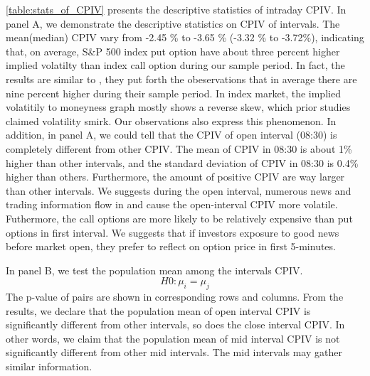 \autoref{table:stats_of_CPIV} presents the descriptive statistics of intraday CPIV. In panel A, we demonstrate the descriptive statistics on CPIV of intervals. The mean(median) CPIV vary from -2.45 \% to -3.65 \% (-3.32 \% to -3.72\%), indicating that, on average, S\&P 500 index put option have about three percent higher implied volatilty than index call option during our sample period. In fact, the results are similar to \textcite{atilgan2015implied}, they put forth the obeservations that in average there are nine percent higher during their sample period. In index market, the implied volatitily to moneyness graph mostly shows a reverse skew, which prior studies \parencite{zhang2008implied} claimed volatility smirk. Our observations also express this phenomenon. In addition, in panel A, we could tell that the CPIV of open interval (08:30) is completely different from other CPIV. The mean of CPIV in 08:30 is about 1\% higher than other intervals, and the standard deviation of CPIV in 08:30 is 0.4\% higher than others. Furthermore, the amount of positive CPIV are way larger than other intervals. We suggests during the open interval, numerous news and trading information flow in and cause the open-interval CPIV more volatile. Futhermore, the call options are more likely to be relatively expensive than put options in first interval. We suggests that if investors exposure to good news before market open, they prefer to reflect on option price in first 5-minutes.  

In panel B, we test the population mean among the intervals CPIV. 
\begin{equation}
H0: \mu _{i} = \mu _{j}
\end{equation}
The p-value of pairs are shown in corresponding rows and columns. From the results, we declare that the population mean of open interval CPIV is significantly different from other intervals, so does the close interval CPIV. In other words, we claim that the population mean of mid interval CPIV is not significantly different from other mid intervals. The mid intervals may gather similar information. 





